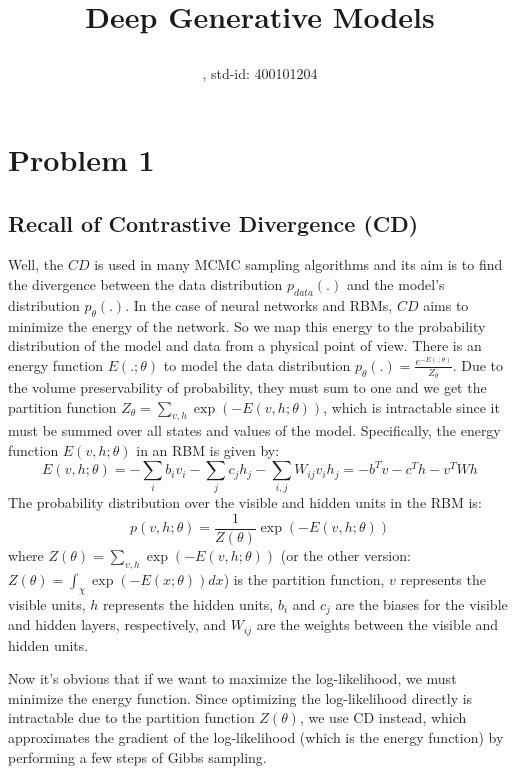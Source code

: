\documentclass{article}
\title{Deep Generative Models \par \exerciseset}
\author{\SecondAuther , std-id: 400101204}
\begin{document}
\maketitle
\section{Problem 1}
\subsection{Recall of Contrastive Divergence (CD)}
Well, the $CD$ is used in many MCMC sampling algorithms and its aim is to find the divergence between the data distribution $p_{data}(.)$ and the model's distribution $p_\theta(.)$. In the case of neural networks and RBMs, $CD$ aims to minimize the energy of the network. So we map this energy to the probability distribution of the model and data from a physical point of view. There is an energy function $E(.;\theta)$ to model the data distribution $p_\theta (.) = \frac{e^{- E(.;\theta)}}{Z_\theta}$. Due to the volume preservability of probability, they must sum to one and we get the partition function $Z_\theta = \sum_{v,h} \exp(-E(v,h; \theta))$, which is intractable since it must be summed over all states and values of the model. Specifically, the energy function \( E(v,h; \theta) \) in an RBM is given by:
\begin{equation*}
E(v,h; \theta) = - \sum_{i} b_i v_i - \sum_{j} c_j h_j - \sum_{i,j} W_{ij} v_i h_j = - b^T v - c^T h - v^T W h
\end{equation*}
The probability distribution over the visible and hidden units in the RBM is:
\begin{equation*}
p(v,h; \theta) = \frac{1}{Z(\theta)} \exp(-E(v,h; \theta))
\end{equation*}
where $Z(\theta) = \sum_{v,h} \exp(-E(v,h; \theta))$ (or the other version: $Z(\theta) = \int_{\chi} \exp(-E(x; \theta)) dx$) is the partition function, \( v \) represents the visible units, \( h \) represents the hidden units, \( b_i \) and \( c_j \) are the biases for the visible and hidden layers, respectively, and \( W_{ij} \) are the weights between the visible and hidden units.

Now it's obvious that if we want to maximize the log-likelihood, we must minimize the energy function. Since optimizing the log-likelihood directly is intractable due to the partition function \( Z(\theta) \), we use CD instead, which approximates the gradient of the log-likelihood (which is the energy function) by performing a few steps of Gibbs sampling.
\end{document}
